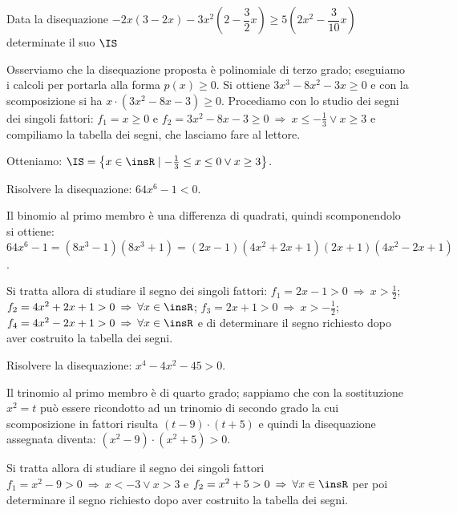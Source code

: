 \begin{exrig}
\begin{esempio}
Data la disequazione $-2x(3-2x)-3x^2\left(2-\dfrac 3 2x\right)\ge 5\left(2x^2-\dfrac 3{10}x\right)$ determinate il suo $\IS$

Osserviamo che la disequazione proposta è polinomiale di terzo grado; eseguiamo i calcoli per portarla alla forma $p(x)\ge 0$. Si ottiene $3x^3-8x^2-3x\ge 0$ e con la scomposizione si ha $x\cdot (3x^2-8x-3)\ge 0$. Procediamo con lo studio dei segni dei singoli fattori: $f_1=x\ge 0$ e $f_2=3x^2-8x-3\ge 0 \:\Rightarrow\: x\le -\frac 1 3\vee x\ge 3$ e compiliamo la tabella dei segni, che lasciamo fare al lettore.
\begin{center}
 
\end{center}
Otteniamo: $\IS=\left\{x\in \insR \mid -\frac 1 3\le x\le 0\vee x\ge 3\right\}$.
\end{esempio}

\begin{esempio}
Risolvere la disequazione: $64x^6-1<0$.

Il binomio al primo membro è una differenza di quadrati, quindi scomponendolo si ottiene: $64x^6-1=(8x^3-1)(8x^3+1)=(2x-1)(4x^2+2x+1)(2x+1)(4x^2-2x+1)$.

Si tratta allora di studiare il segno dei singoli fattori: $f_1=2x-1>0\:\Rightarrow\: x>\frac 1 2$; $f_2=4x^2+2x+1>0\:\Rightarrow\: \forall x\in \insR$; $f_3=2x+1>0\:\Rightarrow\: x>-\frac 1 2$; $f_4=4x^2-2x+1>0\:\Rightarrow\: \forall x\in \insR$ e di determinare il segno richiesto dopo aver costruito la tabella dei segni.
\end{esempio}

\begin{esempio}
Risolvere la disequazione: $x^4-4x^2-45>0$.

Il trinomio al primo membro è di quarto grado; sappiamo che con la sostituzione $x^2=t$ può essere ricondotto ad un trinomio di secondo grado la cui scomposizione in fattori risulta $(t-9)\cdot (t+5)$ e quindi la disequazione assegnata diventa: $(x^2-9)\cdot (x^2+5)>0$.

Si tratta allora di studiare il segno dei singoli fattori $f_1=x^2-9>0\:\Rightarrow\: x<-3\vee x>3$ e $f_2=x^2+5>0\:\Rightarrow\: \forall x\in \insR$ per poi determinare il segno richiesto dopo aver costruito la tabella dei segni.
\end{esempio}
\end{exrig}
\vspazio\ovalbox{\risolvii \ref{ese:4.32}, \ref{ese:4.33}, \ref{ese:4.34}, \ref{ese:4.35}, \ref{ese:4.36}, \ref{ese:4.37}, \ref{ese:4.38}, \ref{ese:4.39}, \ref{ese:4.40}, \ref{ese:4.41}, \ref{ese:4.42}, \ref{ese:4.43}, \ref {ese:4.44},}

